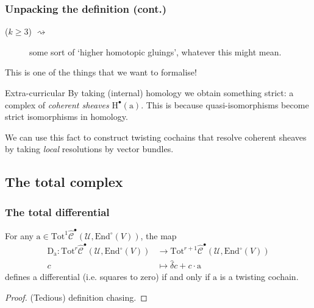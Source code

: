 \documentclass{beamer}
\begin{document}
            \begin{frame}\frametitle{Unpacking the definition (cont.)}
                \begin{description}
                    \item[($k\geqslant3$) $\rightsquigarrow$] some sort of `higher homotopic gluings', whatever this might mean.
                \end{description}

                \pause

                This is one of the things that we want to formalise!

                \pause

                \begin{block}{Extra-curricular}
                    By taking (internal) homology we obtain something strict: a complex of \emph{coherent sheaves} $\mathrm{H}^\bullet(\mathrm{a})$.
                    This is because quasi-isomorphisms become strict isomorphisms in homology.

                    We can use this fact to construct twisting cochains that resolve coherent sheaves by taking \emph{local} resolutions by vector bundles.
                \end{block}
            \end{frame}

        \subsection{The total complex}

            \begin{frame}\frametitle{The total differential}
                \begin{lemma}
                    For any $\mathrm{a}\in\mathrm{Tot}^1\hat{\mathcal{C}}^\bullet(\mathcal{U},\mathrm{End}^\circ(V))$, the map
                    \begin{align*}
                        \mathrm{D}_\mathrm{a} \colon \mathrm{Tot}^r\hat{\mathcal{C}}^\bullet(\mathcal{U},\mathrm{End}^\circ(V)) &\to \mathrm{Tot}^{r+1}\hat{\mathcal{C}}^\bullet(\mathcal{U},\mathrm{End}^\circ(V))\\
                        c &\mapsto \hat{\delta}c+c\cdot\mathrm{a}
                    \end{align*}
                    defines a differential (i.e. squares to zero) if and only if $\mathrm{a}$ is a twisting cochain.
                \end{lemma}
                \begin{proof}
                    (Tedious) definition chasing.
                \end{proof}
            \end{frame}
\end{document}
